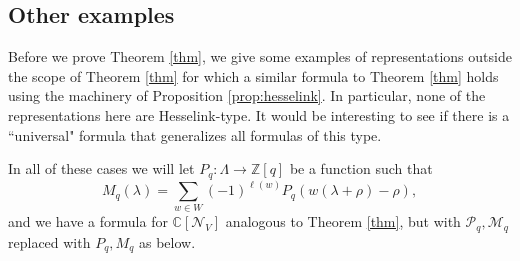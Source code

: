 \documentclass[12pt]{article}
\newcommand{\Z}{\mathbb{Z}}
\newcommand{\C}{\mathbb{C}}
\theoremstyle{definition}
\theoremstyle{remark}
\renewcommand{\P}{\mathcal{P}}
\newcommand{\M}{\mathcal{M}}
\newcommand{\N}{\mathcal{N}}
\begin{document}
\subsection{Other examples}\label{sec:nonexamples}

Before we prove Theorem \ref{thm}, we give some examples of representations outside the scope of Theorem \ref{thm} for which a similar formula to Theorem \ref{thm} holds using the machinery of Proposition \ref{prop:hesselink}. In particular, none of the representations here are Hesselink-type. It would be interesting to see if there is a ``universal" formula that generalizes all formulas of this type.

In all of these cases we will let $P_q:\Lambda\to\Z[q]$ be a function such that
\[M_q(\lambda)=\sum_{w\in W}(-1)^{\ell(w)}P_q(w(\lambda+\rho)-\rho),\]
and we have a formula for $\C[\N_V]$ analogous to Theorem \ref{thm}, but with $\P_q,\M_q$ replaced with $P_q,M_q$ as below.
\end{document}
